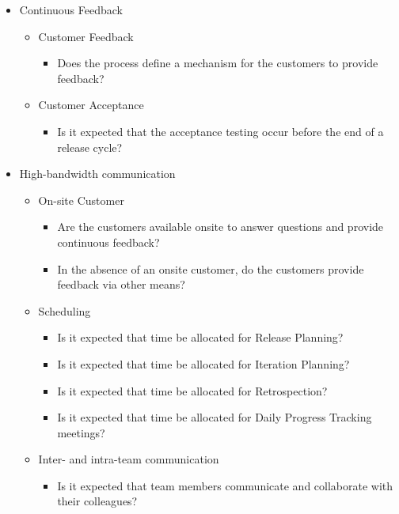 \begin{appendices}
\begin{itemize}
\begin{itemize}
\begin{itemize}
				\end{itemize}
		\end{itemize}
	\item Continuous Feedback
		\begin{itemize}
			\item Customer Feedback
				\begin{itemize}
					\item Does the process define a mechanism for the customers to provide feedback?
				\end{itemize}			
		\end{itemize}
		\begin{itemize}
			\item Customer Acceptance
				\begin{itemize}
					\item Is it expected that the acceptance testing occur before the end of a release cycle?
				\end{itemize}
		\end{itemize}
	\item High-bandwidth communication
		\begin{itemize}
			\item On-site Customer
				\begin{itemize}
					\item Are the customers available onsite to answer questions and provide continuous feedback? 
					\item In the absence of an onsite customer, do the customers provide feedback via other means? 
				\end{itemize}	
			\item Scheduling
				\begin{itemize}
					\item Is it expected that time be allocated for Release Planning?
					\item Is it expected that time be allocated for Iteration Planning?
					\item Is it expected that time be allocated for Retrospection? 
					\item Is it expected that time be allocated for Daily Progress Tracking meetings?
				\end{itemize}
			\item Inter- and intra-team communication
				\begin{itemize}
					\item Is it expected that team members communicate and collaborate with their colleagues?

\end{itemize}
\end{itemize}
\end{itemize}
\end{appendices}
